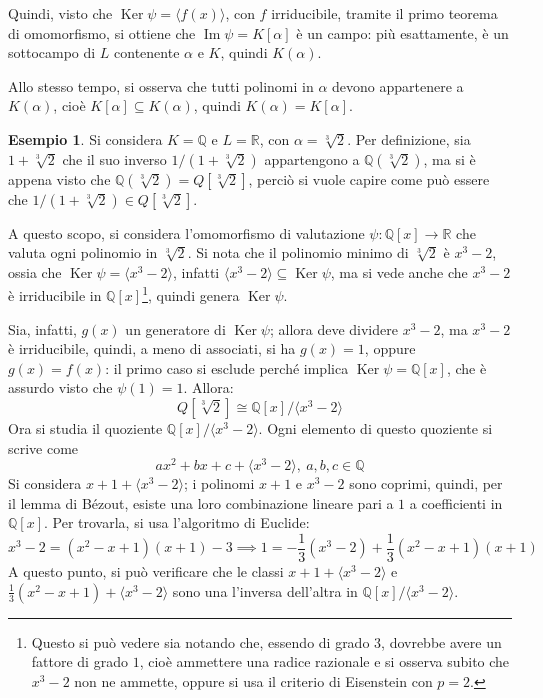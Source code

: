 \documentclass[11pt, a4paper]{scrartcl}
\theoremstyle{definition}
\newtheorem{esempio}{Esempio}
\numberwithin{esempio}{section}
\theoremstyle{definition}
\numberwithin{obs}{section}
\numberwithin{nota}{section}
\numberwithin{equation}{subsection}
\begin{document}
Quindi, visto che $\operatorname{Ker} \psi  = \langle f(x) \rangle$, con $f$ irriducibile, tramite il primo teorema di omomorfismo, si ottiene che $\operatorname{Im} \psi  = K[\alpha ]$ \`e un campo: pi\`u esattamente, \`e un sottocampo di $L$ contenente $\alpha $ e $K$, quindi $K(\alpha )$.

Allo stesso tempo, si osserva che tutti polinomi in $\alpha $ devono appartenere a $K(\alpha )$, cio\`e $K[\alpha ] \subseteq K(\alpha )$, quindi $K(\alpha ) = K[\alpha ]$.
\begin{esempio}
	Si considera $K = \mathbb{Q}$ e $L = \mathbb{R}$, con $\alpha  = \sqrt[3]{2} $.
	Per definizione, sia $1 + \sqrt[3]{2} $ che il suo inverso $1 / (1 + \sqrt[3]{2}) $ appartengono a $\mathbb{Q}(\sqrt[3]{2}) $, ma si \`e appena visto che $\mathbb{Q}(\sqrt[3]{2}) = Q [\sqrt[3]{2} ] $, perci\`o si vuole capire come pu\`o essere che $1 / (1 + \sqrt[3]{2}) \in Q [\sqrt[3]{2} ] $.

	A questo scopo, si considera l'omomorfismo di valutazione $\psi : \mathbb{Q}[x] \to \mathbb{R}$ che valuta ogni polinomio in $\sqrt[3]{2} $.
	Si nota che il polinomio minimo di $\sqrt[3]{2} $ \`e $x^3 - 2$, ossia che $\operatorname{Ker} \psi  = \langle x^3 - 2 \rangle$, infatti $ \langle x^3 - 2 \rangle\subseteq \operatorname{Ker} \psi $, ma si vede anche che $x^3 - 2$ \`e irriducibile in $\mathbb{Q}[x]$\footnote{Questo si pu\`o vedere sia notando che, essendo di grado $3$, dovrebbe avere un fattore di grado $1$, cio\`e ammettere una radice razionale e si osserva subito che $x^3 - 2$ non ne ammette, oppure si usa il criterio di Eisenstein con $p=2$.}, quindi genera $\operatorname{Ker} \psi $.

	Sia, infatti, $g(x)$ un generatore di $\operatorname{Ker} \psi $; allora deve dividere $x^3 - 2$, ma $x^3 -2$ \`e irriducibile, quindi, a meno di associati, si ha $g(x) = 1$, oppure $g(x) = f(x)$: il primo caso si esclude perch\'e implica $\operatorname{Ker} \psi  = \mathbb{Q}[x]$, che \`e assurdo visto che $\psi (1) = 1$.
	Allora:
	\[
		Q[\sqrt[3]{2}] \cong \mathbb{Q}[x] / \langle x^3 - 2 \rangle
	\] 
	Ora si studia il quoziente $\mathbb{Q}[x] / \langle x^3 - 2 \rangle$.
	Ogni elemento di questo quoziente si scrive come
	\[
	ax^2 + bx + c + \langle x^3 - 2 \rangle, \ a,b,c \in \mathbb{Q}
	\] 
	Si considera $x + 1 + \langle x^3 - 2 \rangle$; i polinomi $x+1 $ e $x^3 - 2$ sono coprimi, quindi, per il lemma di B\'ezout, esiste una loro combinazione lineare pari a $1$ a coefficienti in $\mathbb{Q}[x]$.
	Per trovarla, si usa l'algoritmo di Euclide:
	\[
	x^3 - 2 = (x^2 - x + 1)(x+1) - 3\implies 1 = -\frac{1}{3} (x^3 - 2) + \frac{1}{3} (x^2 - x  +1 ) (x+1)
	\] 
	A questo punto, si pu\`o verificare che le classi $x+1 + \langle x^3 - 2 \rangle$ e $\frac{1}{3}(x^2 - x +1) + \langle x^3 -2 \rangle$ sono una l'inversa dell'altra in $\mathbb{Q}[x] / \langle x^3 - 2 \rangle$.


\end{esempio}
\end{document}
